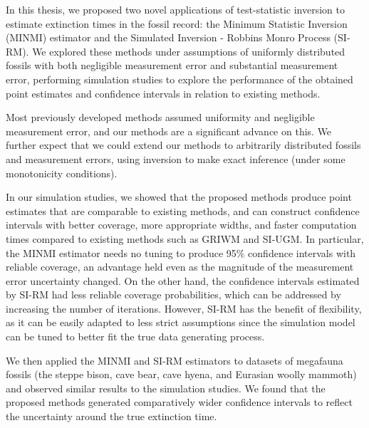 
In this thesis, we proposed two novel applications of test-statistic inversion to estimate extinction times in the fossil record: the Minimum Statistic Inversion (MINMI) estimator and the Simulated Inversion - Robbins Monro Process (SI-RM). We explored these methods under assumptions of uniformly distributed fossils with both negligible measurement error and substantial measurement error, performing simulation studies to explore the performance of the obtained point estimates and confidence intervals in relation to existing methods.

Most previously developed methods assumed uniformity and negligible measurement error, and our methods are a significant advance on this. We further expect that we could extend our methods to arbitrarily distributed fossils and measurement errors, using inversion to make exact inference (under some monotonicity conditions).

In our simulation studies, we showed that the proposed methods produce point estimates that are comparable to existing methods, and can construct confidence intervals with better coverage, more appropriate widths, and faster computation times compared to existing methods such as GRIWM and SI-UGM. In particular, the MINMI estimator needs no tuning to produce 95\% confidence intervals with reliable coverage, an advantage held even as the magnitude of the measurement error uncertainty changed. On the other hand, the confidence intervals estimated by SI-RM had less reliable coverage probabilities, which can be addressed by increasing the number of iterations. However, SI-RM has the benefit of flexibility, as it can be easily adapted to less strict assumptions since the simulation model can be tuned to better fit the true data generating process.

We then applied the MINMI and SI-RM estimators to datasets of megafauna fossils (the steppe bison, cave bear, cave hyena, and Eurasian woolly mammoth) and observed similar results to the simulation studies. We found that the proposed methods generated comparatively wider confidence intervals to reflect the uncertainty around the true extinction time.

